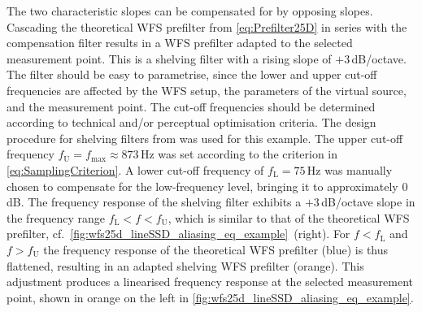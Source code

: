 The two characteristic slopes can be compensated for by opposing slopes.
%
Cascading the theoretical WFS prefilter from \myeq\eqref{eq:Prefilter25D}
in series with the compensation filter results in a WFS prefilter adapted
to the selected measurement point.
%
This is a shelving filter with a rising slope of $+3$\,dB/octave.
%
The filter should be easy to parametrise, since the lower and upper
cut-off frequencies are affected by the WFS setup, the parameters
of the virtual source, and the measurement point.
%
The cut-off frequencies should be determined according to technical
and/or perceptual optimisation criteria.
%
The design procedure for shelving filters from \cite{Schultz2020a}
was used for this example.
%
The upper cut-off frequency $f_\text{U}=f_\text{max} \approx 873$\,Hz
was set according to the criterion in \myeq\eqref{eq:SamplingCriterion}.
%
A lower cut-off frequency of $f_\text{L}=75$\,Hz was manually chosen to
compensate for the low-frequency level, bringing it to approximately $0$\,dB.
%
The frequency response of the shelving filter exhibits a $+3$\,dB/octave slope
in the frequency range $f_\text{L} < f < f_\text{U}$,
which is similar to that of the theoretical WFS prefilter,
cf.~\myfig\ref{fig:wfs25d_lineSSD_aliasing_eq_example}~(right).
%
For $f<f_\text{L}$ and $f>f_\text{U}$ the frequency response of the
theoretical WFS prefilter (blue) is thus flattened, resulting in an adapted
shelving WFS prefilter (orange).
%
This adjustment produces a linearised frequency response at the selected
measurement point, shown in orange on the left
in \myfig\ref{fig:wfs25d_lineSSD_aliasing_eq_example}.



